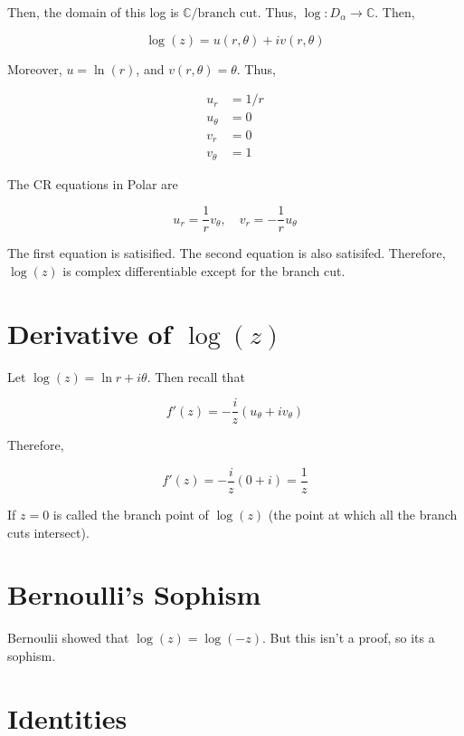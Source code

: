 \documentclass{article}
\newtheorem{one minute paper}[theorem]{One Minute Paper}
\begin{document}
Then, the domain of this log is $\mathbb{C}/\text{branch cut}$. Thus, $\log: D_{\alpha} \to \mathbb{C}$. Then, 

\begin{equation}
    \log(z) = u(r, \theta) + iv(r, \theta)
\end{equation}

Moreover, $u = \ln(r)$, and $v(r,\theta) = \theta$. Thus, 

\begin{align}
    u_r &= 1/r \\
    u_{\theta}  &= 0 \\
    v_r &= 0 \\
    v_{\theta} &= 1
\end{align}

The CR equations in Polar are 

\begin{equation}
    u_r = \frac{1}{r}v_{\theta}, \quad v_r = -\frac{1}{r}u_{\theta}
\end{equation}

The first equation is satisified. The second equation is also satisifed. Therefore, $\log(z)$ is complex differentiable except for the branch cut. 

\section*{Derivative of $\log(z)$}

Let $\log(z) = \ln r + i\theta$. Then recall that

\begin{equation}
    f'(z) = -\frac{i}{z}\left( u_{\theta} + iv_{\theta} \right)
\end{equation}

Therefore, 

\begin{equation}
    f'(z) = -\frac{i}{z}\left( 0 + i \right) = \frac{1}{z}
\end{equation}

If $z=0$ is called the branch point of $\log(z)$ (the point at which all the branch cuts intersect). 

\section*{Bernoulli's Sophism}

Bernoulii showed that $\log(z) = \log(-z)$. But this isn't a proof, so its a sophism. 

\section*{Identities}
\end{document}
